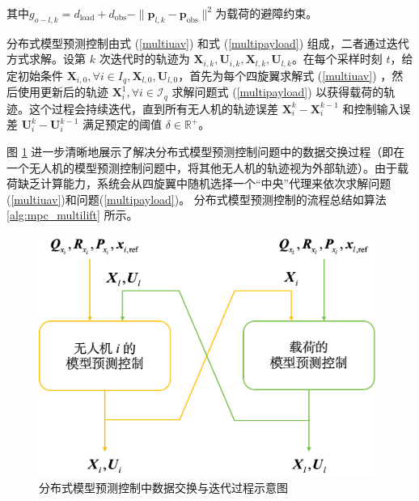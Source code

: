 \documentclass[lang=chs, degree=master, blindreview=true, winfonts=true]{yanputhesis}
\begin{document}
其中$g_{{o-l},k} = d_{\text{load}} + d_{\text{obs}} - \| \bm p_{l,k} - \bm p_{\text{obs}}\|^2$为载荷的避障约束。



分布式模型预测控制由式 (\ref{multiuav}) 和式 (\ref{multipayload}) 组成，二者通过迭代方式求解。设第 $k$ 次迭代时的轨迹为 $\bm X_{i,k}, \bm U_{i,k}, \bm X_{l,k}, \bm U_{l,k}$。在每个采样时刻 $t$，给定初始条件 $\bm X_{i,0}, \forall i \in I_q, \bm X_{l,0}, \bm U_{l,0}$，首先为每个四旋翼求解式 (\ref{multiuav}) ，然后使用更新后的轨迹 $\bm X_i^1, \forall i \in \mathcal{I}_q$ 求解问题式 (\ref{multipayload}) 以获得载荷的轨迹。这个过程会持续迭代，直到所有无人机的轨迹误差 $\bm X_i^k - \bm X_i^{k-1}$ 和控制输入误差 $\bm U_i^k - \bm U_i^{k-1}$ 满足预定的阈值 $\delta \in \mathbb{R}^+$。

图 \ref{4_2} 进一步清晰地展示了解决分布式模型预测控制问题中的数据交换过程（即在一个无人机的模型预测控制问题中，将其他无人机的轨迹视为外部轨迹）。由于载荷缺乏计算能力，系统会从四旋翼中随机选择一个“中央”代理来依次求解问题(\ref{multiuav})和问题(\ref{multipayload})。
分布式模型预测控制的流程总结如算法 \ref{alg:mpc_multilift} 所示。

\begin{figure}[hbt!]
	\centering
	\includegraphics[width=26pc]{picture/4_2.png} 
	\caption{分布式模型预测控制中数据交换与迭代过程示意图
	} 
	\label{4_2}
\end{figure}
\end{document}
